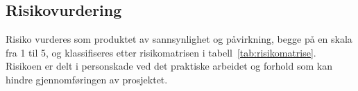 \subsection{Risikovurdering}
\label{app:risiko}
Risiko vurderes som produktet av sannsynlighet og påvirkning, begge på en skala fra 1 til 5, og klassifiseres etter risikomatrisen i tabell~\ref{tab:risikomatrise}. Risikoen er delt i personskade ved det praktiske arbeidet og forhold som kan hindre gjennomføringen av prosjektet.

\newcommand{\riskcell}[3]{\cellcolor{#1}\textbf{#2}\newline\textbf{#3}}
\newcommand{\riskscore}[1]{%
    \ifnum#1>14 \cellcolor{riskextreme}\else
    \ifnum#1>7 \cellcolor{riskhigh}\else
    \ifnum#1>3 \cellcolor{riskmoderate}\else
    \cellcolor{risklow}\fi\fi\fi #1}
